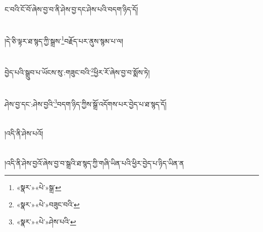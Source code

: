 ང་བའི་ངོ་བོ་ཞེས་བྱ་བ་ནི་ཤེས་བྱ་དང་ཤེས་པའི་བདག་ཉིད་དོ།\chapter{ }།དེ་ཅི་ལྟར་ཐ་སྙད་ཀྱི་སྒྲས་\footnote{«སྣར་»«པེ་»སྒྲ་}བརྗོད་པར་ནུས་སྙམ་པ་ལ།\chapter{ }བྱེད་པའི་སྒྲུབ་པ་ཡོངས་སུ་:གཟུང་བའི་\footnote{«སྣར་»«པེ་»བཟུང་བའི་}ཕྱིར་རོ་ཞེས་བྱ་བ་སྨོས་ཏེ།\chapter{ }ཤེས་བྱ་དང་:ཤེས་བྱའི་\footnote{«སྣར་»«པེ་»ཤེས་པའི་}བདག་ཉིད་ཀྱིས་སྒྲོ་འདོགས་པར་བྱེད་པ་ཐ་སྙད་དོ།\chapter{ }།འདི་ནི་ཤེས་པའོ།\chapter{ }།འདི་ནི་ཤེས་བྱའོ་ཞེས་བྱ་བ་སྒྲའི་ཐ་སྙད་ཀྱི་གཞི་ཡིན་པའི་ཕྱིར་བྱེད་པ་ཉིད་ཡིན་ན